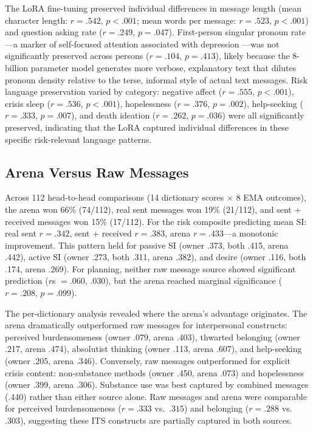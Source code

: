 \documentclass[review,12pt,authoryear]{elsarticle}
\begin{document}
The LoRA fine-tuning preserved individual differences in message length (mean character length: $r = .542$, $p < .001$; mean words per message: $r = .523$, $p < .001$) and question asking rate ($r = .249$, $p = .047$). First-person singular pronoun rate---a marker of self-focused attention associated with depression \citep{rude2004language}---was not significantly preserved across persons ($r = .104$, $p = .413$), likely because the 8-billion parameter model generates more verbose, explanatory text that dilutes pronoun density relative to the terse, informal style of actual text messages. Risk language preservation varied by category: negative affect ($r = .555$, $p < .001$), crisis sleep ($r = .536$, $p < .001$), hopelessness ($r = .376$, $p = .002$), help-seeking ($r = .333$, $p = .007$), and death ideation ($r = .262$, $p = .036$) were all significantly preserved, indicating that the LoRA captured individual differences in these specific risk-relevant language patterns.

\subsection{Arena Versus Raw Messages}

Across 112 head-to-head comparisons (14 dictionary scores $\times$ 8 EMA outcomes), the arena won 66\% (74/112), real sent messages won 19\% (21/112), and sent + received messages won 15\% (17/112). For the risk composite predicting mean SI: real sent $r = .342$, sent + received $r = .383$, arena $r = .433$---a monotonic improvement. This pattern held for passive SI (owner .373, both .415, arena .442), active SI (owner .273, both .311, arena .382), and desire (owner .116, both .174, arena .269). For planning, neither raw message source showed significant prediction ($r$s $= .060$, $.030$), but the arena reached marginal significance ($r = .208$, $p = .099$).

The per-dictionary analysis revealed where the arena's advantage originates. The arena dramatically outperformed raw messages for interpersonal constructs: perceived burdensomeness (owner .079, arena .403), thwarted belonging (owner .217, arena .474), absolutist thinking (owner .113, arena .607), and help-seeking (owner .205, arena .346). Conversely, raw messages outperformed for explicit crisis content: non-substance methods (owner .450, arena .073) and hopelessness (owner .399, arena .306). Substance use was best captured by combined messages (.440) rather than either source alone. Raw messages and arena were comparable for perceived burdensomeness ($r = .333$ vs.\ $.315$) and belonging ($r = .288$ vs.\ $.303$), suggesting these ITS constructs are partially captured in both sources.
\end{document}
